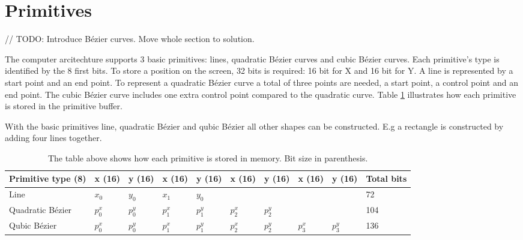 \section{Primitives}

// TODO: Introduce Bézier curves. Move whole section to solution.

The computer arcitechture supports 3 basic primitives: lines, quadratic Bézier curves and cubic Bézier curves.
Each primitive's type is identified by the 8 first bits.
To store a position on the screen, 32 bits is required: 16 bit for X and 16 bit for Y.
A line is represented by a start point and an end point.
To represent a quadratic Bézier curve a total of three points are needed, a start point, a control point and an end point.
The cubic Bézier curve includes one extra control point compared to the quadratic curve.
Table \ref{tbl:primitives} illustrates how each primitive is stored in the primitive buffer.

With the basic primitives line, quadratic Bézier and qubic Bézier all other shapes can be constructed.
E.g a rectangle is constructed by adding four lines together.

\begin{table}[h]
    \centering
    \label{tbl:primitives}
    \begin{tabular}{|l|l|l|l|l|l|l|l|l|l|}
    \hline
    Primitive type (8) & x (16) & y (16) & x (16) & y (16) & x (16) & y (16) & x (16) & y (16) & Total bits \\ \hline
    Line             & \(x_0 \)  & \(y_0 \)  & \(x_1 \)  & \(y_0 \)  & ~   & ~   & ~   & ~   & 72    \\ \hline
    Quadratic Bézier & \(p_0^x \) & \(p_0^y \) & \(p_1^x \) & \(p_1^y \) & \(p_2^x \) & \(p_2^y \) & ~   & ~   & 104   \\ \hline
    Qubic Bézier     & \(p_0^x \) & \(p_0^y \) & \(p_1^x \) & \(p_1^y \) & \(p_2^x \) & \(p_2^y \) & \(p_3^x \) & \(p_3^y \) & 136   \\ \hline
    \end{tabular}
    \caption{The table above shows how each primitive is stored in memory. Bit size in parenthesis.}
\end{table}
